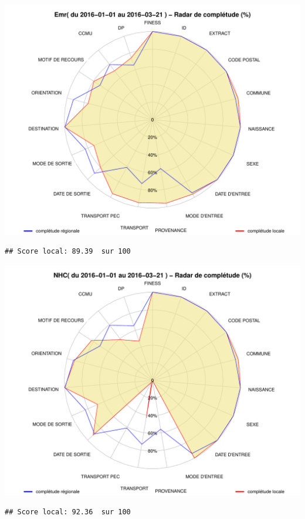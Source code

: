 \documentclass[]{article}
\begin{document}
\includegraphics{completude_files/figure-latex/finess-3.pdf}

\begin{verbatim}
## Score local: 89.39  sur 100
\end{verbatim}

\includegraphics{completude_files/figure-latex/finess-4.pdf}

\begin{verbatim}
## Score local: 92.36  sur 100
\end{verbatim}
\end{document}

